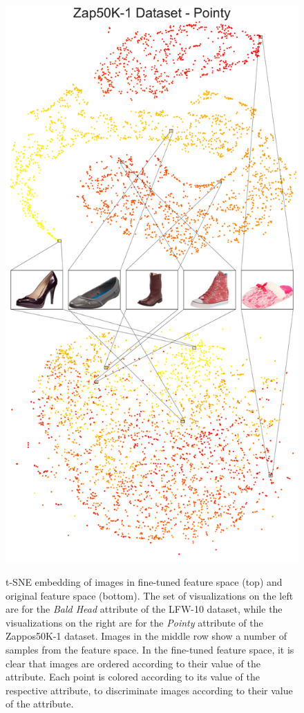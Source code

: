 \documentclass[runningheads]{llncs}
\begin{document}
\begin{figure}
{\includegraphics{zappos-pointy-featspace.pdf}
}
\caption{t-SNE embedding of images in fine-tuned feature space (top) and original feature space (bottom). The set of visualizations on the left are for the \textit{Bald Head} attribute of the LFW-10 dataset, while the visualizations on the right are for the \textit{Pointy} attribute of the Zappos50K-1 dataset. Images in the middle row show a number of samples from the feature space. In the fine-tuned feature space, it is clear that images are ordered according to their value of the attribute. Each point is colored according to its value of the respective attribute, to discriminate images according to their value of the attribute.}
\label{featspace}
\end{figure}
\end{document}
